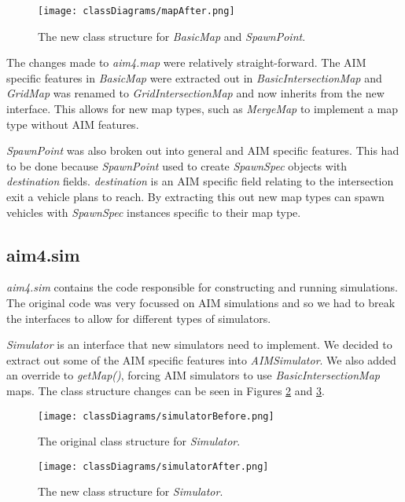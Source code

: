 \begin{appendices}
\begin{figure}[htb]
\texttt{[image: classDiagrams/mapAfter.png]}
\caption{The new class structure for \emph{BasicMap} and \emph{SpawnPoint}.}
\label{fig:mapAfter}
\end{figure}

The changes made to \emph{aim4.map} were relatively straight-forward. The AIM specific features in \emph{BasicMap} were extracted out in \emph{BasicIntersectionMap} and \emph{GridMap} was renamed to \emph{GridIntersectionMap} and now inherits from the new interface. This allows for new map types, such as \emph{MergeMap} to implement a map type without AIM features.

\emph{SpawnPoint} was also broken out into general and AIM specific features. This had to be done because \emph{SpawnPoint} used to create \emph{SpawnSpec} objects with \emph{destination} fields. \emph{destination} is an AIM specific field relating to the intersection exit a vehicle plans to reach. By extracting this out new map types can spawn vehicles with \emph{SpawnSpec} instances specific to their map type.

\subsection{aim4.sim}
\label{subsec:aim4.sim}
\emph{aim4.sim} contains the code responsible for constructing and running simulations. The original code was very focussed on AIM simulations and so we had to break the interfaces to allow for different types of simulators. 

\emph{Simulator} is an interface that new simulators need to implement. We decided to extract out some of the AIM specific features into \emph{AIMSimulator}. We also added an override to \emph{getMap()}, forcing AIM simulators to use \emph{BasicIntersectionMap} maps. The class structure changes can be seen in Figures \ref{fig:simulatorBefore} and \ref{fig:simulatorAfter}.

\begin{figure}[htb]
\texttt{[image: classDiagrams/simulatorBefore.png]}
\caption{The original class structure for \emph{Simulator}.}
\label{fig:simulatorBefore}
\end{figure}

\begin{figure}[htb]
\texttt{[image: classDiagrams/simulatorAfter.png]}
\caption{The new class structure for \emph{Simulator}.}
\label{fig:simulatorAfter}
\end{figure}


\end{appendices}
